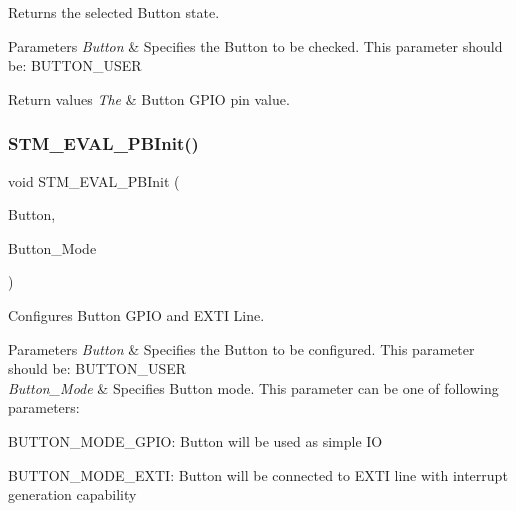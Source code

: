 Returns the selected Button state. 


\begin{DoxyParams}{Parameters}
{\em Button} & Specifies the Button to be checked. This parameter should be\+: B\+U\+T\+T\+O\+N\+\_\+\+U\+S\+ER\\
\hline
\end{DoxyParams}

\begin{DoxyRetVals}{Return values}
{\em The} & Button G\+P\+IO pin value. \\
\hline
\end{DoxyRetVals}
\mbox{\label{group___s_t_m32_f1_x_x___n_u_c_l_e_o___l_o_w___l_e_v_e_l___private___functions_ga1cdc19fe328ddcd17bf50fcb62d78369}} 
\subsubsection{\texorpdfstring{STM\_EVAL\_PBInit()}{STM\_EVAL\_PBInit()}}
{\footnotesize\ttfamily void S\+T\+M\+\_\+\+E\+V\+A\+L\+\_\+\+P\+B\+Init (\begin{DoxyParamCaption}\item[{\mbox{\hyperlink{group___s_t_m32_f1_x_x___n_u_c_l_e_o___l_o_w___l_e_v_e_l___exported___types_ga643816dfbad5c734fc25a29ce8d35bb1}{Button\+\_\+\+Type\+Def}}}]{Button,  }\item[{\mbox{\hyperlink{group___s_t_m32_f1_x_x___n_u_c_l_e_o___l_o_w___l_e_v_e_l___exported___types_ga48825b7c7d851c440ef8e808fd9d8f0a}{Button\+Mode\+\_\+\+Type\+Def}}}]{Button\+\_\+\+Mode }\end{DoxyParamCaption})}



Configures Button G\+P\+IO and E\+X\+TI Line. 


\begin{DoxyParams}{Parameters}
{\em Button} & Specifies the Button to be configured. This parameter should be\+: B\+U\+T\+T\+O\+N\+\_\+\+U\+S\+ER \\
\hline
{\em Button\+\_\+\+Mode} & Specifies Button mode. This parameter can be one of following parameters\+:\\
\hline
\end{DoxyParams}
\begin{DoxyItemize}
\item B\+U\+T\+T\+O\+N\+\_\+\+M\+O\+D\+E\+\_\+\+G\+P\+IO\+: Button will be used as simple IO \item B\+U\+T\+T\+O\+N\+\_\+\+M\+O\+D\+E\+\_\+\+E\+X\+TI\+: Button will be connected to E\+X\+TI line with interrupt generation capability\end{DoxyItemize}

